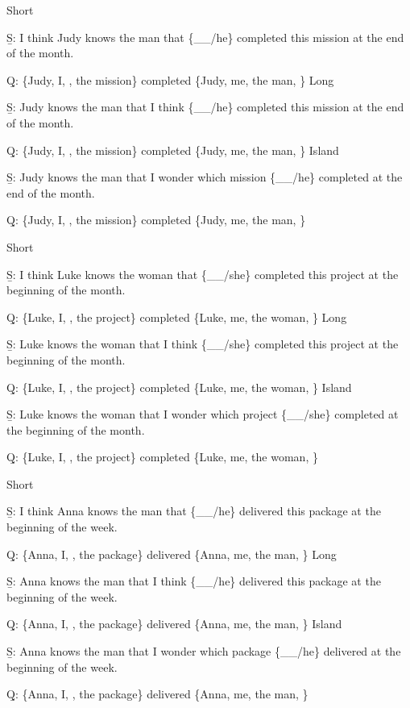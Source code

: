 \pex 
\a Short\par\nobreak
\beginsubsub 
\b{S:} I think Judy knows the man that \{\_\_/he\} completed this mission at the end of the month.\par\nobreak
\b{Q:} \{Judy, I, , the mission\} completed \{Judy, me, the man, \}
\endsubsub
\a Long\par\nobreak
\beginsubsub
\b{S:} Judy knows the man that I think \{\_\_/he\} completed this mission at the end of the month.\par\nobreak
\b{Q:} \{Judy, I, , the mission\} completed \{Judy, me, the man, \}
\endsubsub
\a Island\par\nobreak
\beginsubsub
\b{S:} Judy knows the man that I wonder which mission \{\_\_/he\} completed at the end of the month.\par\nobreak
\b{Q:} \{Judy, I, , the mission\} completed \{Judy, me, the man, \}
\endsubsub
\xe

\pex 
\a Short\par\nobreak
\beginsubsub 
\b{S:} I think Luke knows the woman that \{\_\_/she\} completed this project at the beginning of the month.\par\nobreak
\b{Q:} \{Luke, I, , the project\} completed \{Luke, me, the woman, \}
\endsubsub
\a Long\par\nobreak
\beginsubsub
\b{S:} Luke knows the woman that I think \{\_\_/she\} completed this project at the beginning of the month.\par\nobreak
\b{Q:} \{Luke, I, , the project\} completed \{Luke, me, the woman, \}
\endsubsub
\a Island\par\nobreak
\beginsubsub
\b{S:} Luke knows the woman that I wonder which project \{\_\_/she\} completed at the beginning of the month.\par\nobreak
\b{Q:} \{Luke, I, , the project\} completed \{Luke, me, the woman, \}
\endsubsub
\xe

\pex 
\a Short\par\nobreak
\beginsubsub 
\b{S:} I think Anna knows the man that \{\_\_/he\} delivered this package at the beginning of the week.\par\nobreak
\b{Q:} \{Anna, I, , the package\} delivered \{Anna, me, the man, \}
\endsubsub
\a Long\par\nobreak
\beginsubsub
\b{S:} Anna knows the man that I think \{\_\_/he\} delivered this package at the beginning of the week.\par\nobreak
\b{Q:} \{Anna, I, , the package\} delivered \{Anna, me, the man, \}
\endsubsub
\a Island\par\nobreak
\beginsubsub
\b{S:} Anna knows the man that I wonder which package \{\_\_/he\} delivered at the beginning of the week.\par\nobreak
\b{Q:} \{Anna, I, , the package\} delivered \{Anna, me, the man, \}
\endsubsub
\xe

